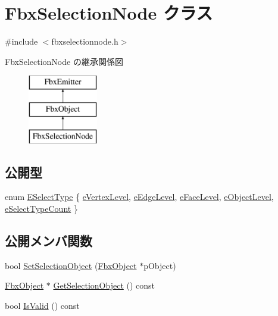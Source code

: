 \hypertarget{class_fbx_selection_node}{}\section{Fbx\+Selection\+Node クラス}
\label{class_fbx_selection_node}


{\ttfamily \#include $<$fbxselectionnode.\+h$>$}

Fbx\+Selection\+Node の継承関係図\begin{figure}[H]
\begin{center}
\leavevmode
\includegraphics[height=3.000000cm]{class_fbx_selection_node}
\end{center}
\end{figure}
\subsection*{公開型}
\begin{DoxyCompactItemize}
\item 
enum \hyperlink{class_fbx_selection_node_aa24cf47b60ff436a1cce9409da37e78f}{E\+Select\+Type} \{ \newline
\hyperlink{class_fbx_selection_node_aa24cf47b60ff436a1cce9409da37e78fa4b0313e9b717470c120c183febb4cc18}{e\+Vertex\+Level}, 
\hyperlink{class_fbx_selection_node_aa24cf47b60ff436a1cce9409da37e78faa3159ebdf64f71125b01fbc012ffa57a}{e\+Edge\+Level}, 
\hyperlink{class_fbx_selection_node_aa24cf47b60ff436a1cce9409da37e78fa0a0a561141a2474c800b732fd42428cc}{e\+Face\+Level}, 
\hyperlink{class_fbx_selection_node_aa24cf47b60ff436a1cce9409da37e78fa5c26b8b56bfce101fe25c1b7f1bd9878}{e\+Object\+Level}, 
\newline
\hyperlink{class_fbx_selection_node_aa24cf47b60ff436a1cce9409da37e78fa6f7e60aadbb76284e3352814a5a4f299}{e\+Select\+Type\+Count}
 \}
\end{DoxyCompactItemize}
\subsection*{公開メンバ関数}
\begin{DoxyCompactItemize}
\item 
bool \hyperlink{class_fbx_selection_node_a6682d7ec3a7f7b9083962c212e7badd2}{Set\+Selection\+Object} (\hyperlink{class_fbx_object}{Fbx\+Object} $\ast$p\+Object)
\item 
\hyperlink{class_fbx_object}{Fbx\+Object} $\ast$ \hyperlink{class_fbx_selection_node_a1c78c8d31e14c7cb99e059963eee820c}{Get\+Selection\+Object} () const
\item 
bool \hyperlink{class_fbx_selection_node_a600d1609bd33e1453f082a971a9498f9}{Is\+Valid} () const
\end{DoxyCompactItemize}
